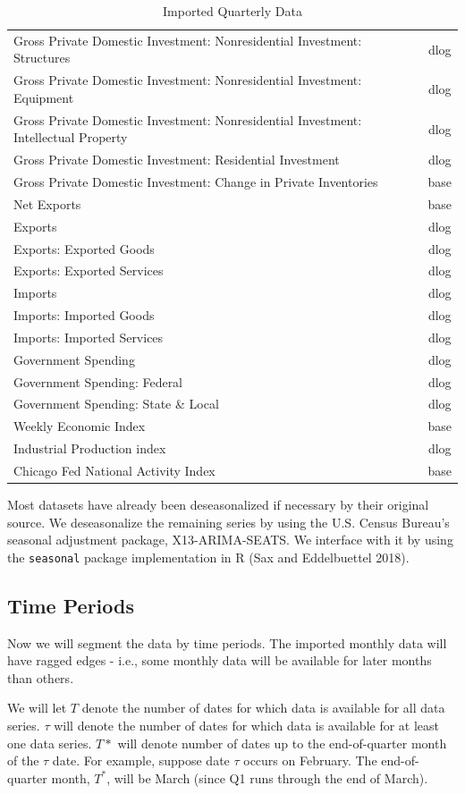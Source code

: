 \documentclass[11pt, letterpaper]{article}\usepackage[]{graphicx}\usepackage[]{color}
\begin{document}
\begin{table}[H]
\begin{tabular}{lc}
  Gross Private Domestic Investment: Nonresidential Investment: Structures & dlog \\ 
  Gross Private Domestic Investment: Nonresidential Investment: Equipment & dlog \\ 
  Gross Private Domestic Investment: Nonresidential Investment: Intellectual Property & dlog \\ 
  Gross Private Domestic Investment: Residential Investment & dlog \\ 
  Gross Private Domestic Investment: Change in Private Inventories & base \\ 
  Net Exports & base \\ 
  Exports & dlog \\ 
  Exports: Exported Goods & dlog \\ 
  Exports: Exported Services & dlog \\ 
  Imports & dlog \\ 
  Imports: Imported Goods & dlog \\ 
  Imports: Imported Services & dlog \\ 
  Government Spending & dlog \\ 
  Government Spending: Federal & dlog \\ 
  Government Spending: State \& Local & dlog \\ 
  Weekly Economic Index & base \\ 
  Industrial Production index & dlog \\ 
  Chicago Fed National Activity Index & base \\ 
   \hline
\end{tabular}
\endgroup
\caption{Imported Quarterly Data} 
\end{table}


Most datasets have already been deseasonalized if necessary by their original source. We deseasonalize the remaining series by using the U.S. Census Bureau's seasonal adjustment package, X13-ARIMA-SEATS. We interface with it by using the \texttt{seasonal} package implementation in R (Sax and Eddelbuettel 2018).

\subsection{Time Periods}
Now we will segment the data by time periods. The imported monthly data will have ragged edges - i.e., some monthly data will be available for later months than others.

We will let $T$ denote the number of dates for which data is available for all data series. $\tau$ will denote the number of dates for which data is available for at least one data series. $T*$ will denote number of dates up to the end-of-quarter month of the $\tau$ date. For example, suppose date $\tau$ occurs on February. The end-of-quarter month, $T^*$, will be March (since Q1 runs through the end of March). 
\end{document}
